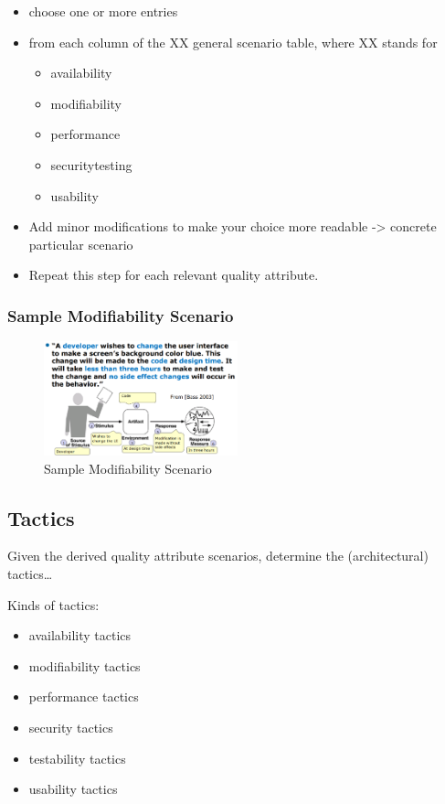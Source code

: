 \begin{itemize}
\tightlist
\item
  choose one or more entries
\item
  from each column of the XX general scenario table, where XX stands for

  \begin{itemize}
  \tightlist
  \item
    availability
  \item
    modifiability
  \item
    performance
  \item
    securitytesting
  \item
    usability
  \end{itemize}
\item
  Add minor modifications to make your choice more readable
  -\textgreater{} concrete particular scenario
\item
  Repeat this step for each relevant quality attribute.
\end{itemize}

\subsubsection{Sample Modifiability Scenario}
\begin{figure}[H]
\centering
\includegraphics[width=0.5\textwidth]{figures/Wish.PNG}
\caption{Sample Modifiability Scenario}
\end{figure}


\clearpage
\hypertarget{tactics}{%
\subsection{Tactics}\label{tactics}}

Given the derived quality attribute scenarios, determine the
(architectural) tactics\ldots{}

Kinds of tactics:

\begin{itemize}
\tightlist
\item
  availability tactics
\item
  modifiability tactics
\item
  performance tactics
\item
  security tactics
\item
  testability tactics
\item
  usability tactics
\end{itemize}

